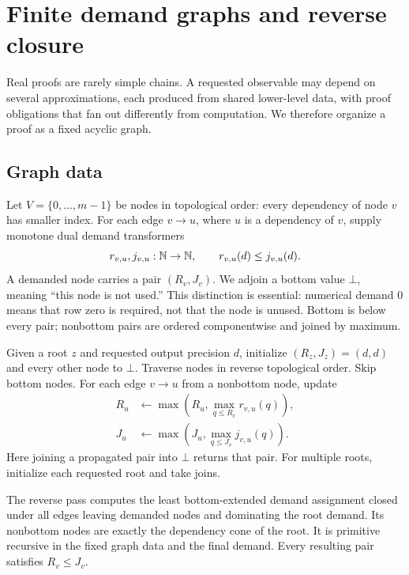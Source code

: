 \section{Finite demand graphs and reverse closure}
\label{sec:demand-graphs}

Real proofs are rarely simple chains.  A requested observable may depend on several
approximations, each produced from shared lower-level data, with proof obligations
that fan out differently from computation.  We therefore organize a proof as a fixed
acyclic graph.

\subsection{Graph data}

Let \(V=\{0,\ldots,m-1\}\) be nodes in topological order: every dependency of node
\(v\) has smaller index.  For each edge \(v\to u\), where \(u\) is a dependency of
\(v\), supply monotone dual demand transformers
\[
  r_{v,u},j_{v,u}:\mathbb N\to\mathbb N,
  \qquad r_{v,u}(d)\le j_{v,u}(d).
\]
A demanded node carries a pair \((R_v,J_v)\).  We adjoin a bottom value
\(\bot\), meaning ``this node is not used.''  This distinction is essential: numerical
demand \(0\) means that row zero is required, not that the node is unused.  Bottom is
below every pair; nonbottom pairs are ordered componentwise and joined by maximum.

Given a root \(z\) and requested output precision \(d\), initialize
\((R_z,J_z)=(d,d)\) and every other node to \(\bot\).  Traverse nodes in reverse
topological order.  Skip bottom nodes.  For each edge \(v\to u\) from a nonbottom node,
update
\[
\begin{split}
 R_u&\leftarrow\max\left(R_u,\max_{q\le R_v}r_{v,u}(q)\right),\\
 J_u&\leftarrow\max\left(J_u,\max_{q\le J_v}j_{v,u}(q)\right).
\end{split}
\]
Here joining a propagated pair into \(\bot\) returns that pair.  For multiple roots,
initialize each requested root and take joins.

\begin{theorem}
\label{thm:demand-closure}
The reverse pass computes the least bottom-extended demand assignment closed under
all edges leaving demanded nodes and dominating the root demand.  Its nonbottom nodes
are exactly the dependency cone of the root.  It is primitive recursive in the fixed
graph data and the final demand.  Every resulting pair satisfies \(R_v\le J_v\).
\end{theorem}

